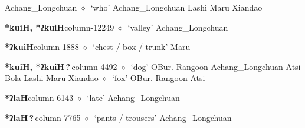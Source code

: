          Achang\_Longchuan 
\hspace{1ex}
         $\diamond$~`who'
         Achang\_Longchuan 
\hspace{1ex}
         Lashi 
\hspace{1ex}
         Maru 
\hspace{1ex}
         Xiandao 
  \item {\footnotesize \textbf{*kuiH, *ʔkuiH}}{\tiny column-12249}
         $\diamond$~`valley'
         Achang\_Longchuan 
  \item {\footnotesize \textbf{*ʔkuiH}}{\tiny column-1888}
         $\diamond$~`chest / box / trunk'
         Maru 
  \item {\footnotesize \textbf{*kuiH, *ʔkuiH\,?\,}}{\tiny column-4492}
         $\diamond$~`dog'
         OBur. 
\hspace{1ex}
         Rangoon 
\hspace{1ex}
         Achang\_Longchuan 
\hspace{1ex}
         Atsi 
\hspace{1ex}
         Bola 
\hspace{1ex}
         Lashi 
\hspace{1ex}
         Maru 
\hspace{1ex}
         Xiandao 
\hspace{1ex}
         $\diamond$~`fox'
         OBur. 
\hspace{1ex}
         Rangoon 
\hspace{1ex}
         Atsi 
  \item {\footnotesize \textbf{*ʔlaH}}{\tiny column-6143}
         $\diamond$~`late'
         Achang\_Longchuan 
  \item {\footnotesize \textbf{*ʔlaH\,?\,}}{\tiny column-7765}
         $\diamond$~`pants / trousers'
         Achang\_Longchuan 
\hspace{1ex}
